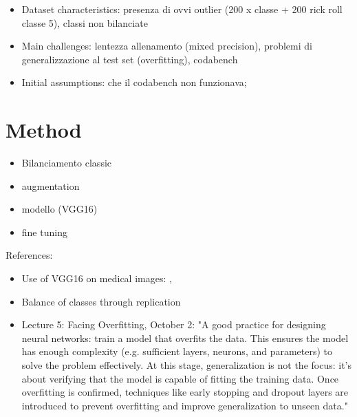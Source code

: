 \documentclass[11pt]{article}
\begin{document}
\begin{multicols*}{2}
        \begin{itemize}
            \item Dataset characteristics: presenza di ovvi outlier (200 x classe + 200 rick roll classe 5), classi non bilanciate
            \item Main challenges: lentezza allenamento (mixed precision), problemi di generalizzazione al test set (overfitting), codabench
            \item Initial assumptions: che il codabench non funzionava; 
        \end{itemize}

        \section{Method} 
        \begin{itemize}
            \item Bilanciamento classic
            \item augmentation
            \item modello (VGG16)
            \item fine tuning
        \end{itemize}
        References:
        \begin{itemize}
            \item Use of VGG16 on medical images: \cite{guan2019vgg16}, \cite{acevedo2019bloodcells}
            \item Balance of classes through replication
            \item Lecture 5: Facing Overfitting, October 2: "A good practice for designing neural networks: train a model that overfits the data. This ensures the model has enough complexity (e.g. sufficient layers, neurons, and parameters) to solve the problem effectively. At this stage, generalization is not the focus: it's about verifying that the model is capable of fitting the training data. Once overfitting is confirmed, techniques like early stopping and dropout layers are introduced to prevent overfitting and improve generalization to unseen data."
        \end{itemize}

        
        
        
    
    \end{multicols*}
\end{document}
